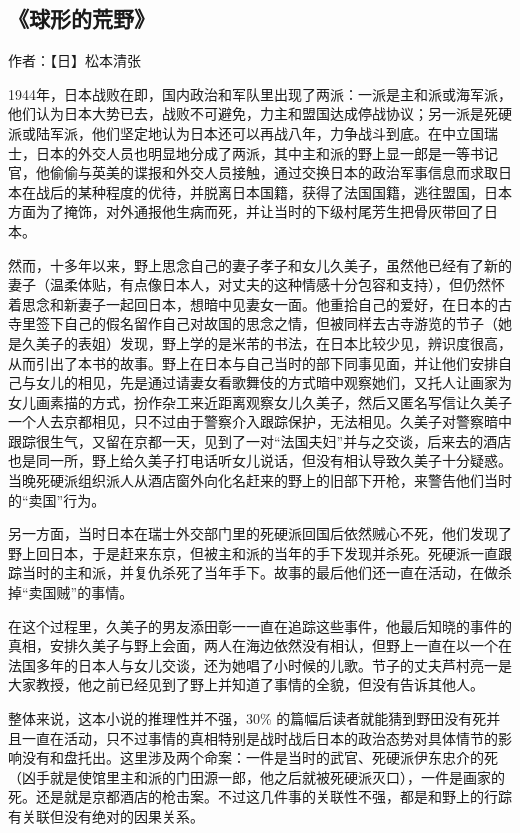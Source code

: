\subsection{《球形的荒野》}

作者：【日】松本清张

1944年，日本战败在即，国内政治和军队里出现了两派：一派是主和派或海军派，他们认为日本大势已去，战败不可避免，力主和盟国达成停战协议；另一派是死硬派或陆军派，他们坚定地认为日本还可以再战八年，力争战斗到底。在中立国瑞士，日本的外交人员也明显地分成了两派，其中主和派的野上显一郎是一等书记官，他偷偷与英美的谍报和外交人员接触，通过交换日本的政治军事信息而求取日本在战后的某种程度的优待，并脱离日本国籍，获得了法国国籍，逃往盟国，日本方面为了掩饰，对外通报他生病而死，并让当时的下级村尾芳生把骨灰带回了日本。

然而，十多年以来，野上思念自己的妻子孝子和女儿久美子，虽然他已经有了新的妻子（温柔体贴，有点像日本人，对丈夫的这种情感十分包容和支持），但仍然怀着思念和新妻子一起回日本，想暗中见妻女一面。他重拾自己的爱好，在日本的古寺里签下自己的假名留作自己对故国的思念之情，但被同样去古寺游览的节子（她是久美子的表姐）发现，野上学的是米芾的书法，在日本比较少见，辨识度很高，从而引出了本书的故事。野上在日本与自己当时的部下同事见面，并让他们安排自己与女儿的相见，先是通过请妻女看歌舞伎的方式暗中观察她们，又托人让画家为女儿画素描的方式，扮作杂工来近距离观察女儿久美子，然后又匿名写信让久美子一个人去京都相见，只不过由于警察介入跟踪保护，无法相见。久美子对警察暗中跟踪很生气，又留在京都一天，见到了一对“法国夫妇”并与之交谈，后来去的酒店也是同一所，野上给久美子打电话听女儿说话，但没有相认导致久美子十分疑惑。当晚死硬派组织派人从酒店窗外向化名赶来的野上的旧部下开枪，来警告他们当时的“卖国”行为。

另一方面，当时日本在瑞士外交部门里的死硬派回国后依然贼心不死，他们发现了野上回日本，于是赶来东京，但被主和派的当年的手下发现并杀死。死硬派一直跟踪当时的主和派，并复仇杀死了当年手下。故事的最后他们还一直在活动，在做杀掉“卖国贼”的事情。

在这个过程里，久美子的男友添田彰一一直在追踪这些事件，他最后知晓的事件的真相，安排久美子与野上会面，两人在海边依然没有相认，但野上一直在以一个在法国多年的日本人与女儿交谈，还为她唱了小时候的儿歌。节子的丈夫芦村亮一是大家教授，他之前已经见到了野上并知道了事情的全貌，但没有告诉其他人。

整体来说，这本小说的推理性并不强，30\% 的篇幅后读者就能猜到野田没有死并且一直在活动，只不过事情的真相特别是战时战后日本的政治态势对具体情节的影响没有和盘托出。这里涉及两个命案：一件是当时的武官、死硬派伊东忠介的死（凶手就是使馆里主和派的门田源一郎，他之后就被死硬派灭口），一件是画家的死。还是就是京都酒店的枪击案。不过这几件事的关联性不强，都是和野上的行踪有关联但没有绝对的因果关系。

